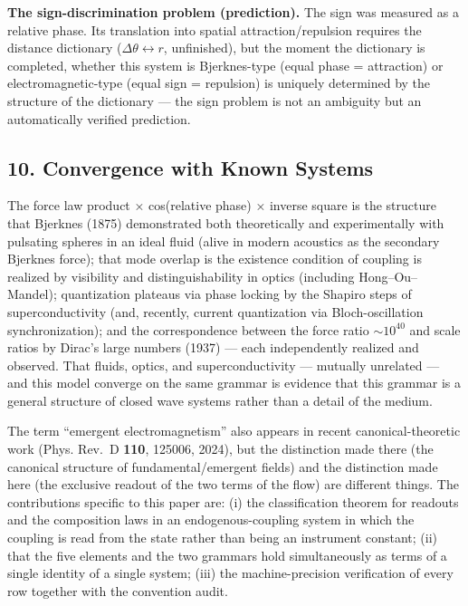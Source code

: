 \documentclass[
  a4paper,
]{article}
\begin{document}
\textbf{The sign-discrimination problem (prediction).} The sign was
measured as a relative phase. Its translation into spatial
attraction/repulsion requires the distance dictionary
(\(\Delta\theta\leftrightarrow r\), unfinished), but the moment the
dictionary is completed, whether this system is Bjerknes-type (equal
phase = attraction) or electromagnetic-type (equal sign = repulsion) is
uniquely determined by the structure of the dictionary --- the sign
problem is not an ambiguity but an automatically verified prediction.

\subsection{10. Convergence with Known
Systems}\label{convergence-with-known-systems}

The force law product × cos(relative phase) × inverse square is the
structure that Bjerknes (1875) demonstrated both theoretically and
experimentally with pulsating spheres in an ideal fluid (alive in modern
acoustics as the secondary Bjerknes force); that mode overlap is the
existence condition of coupling is realized by visibility and
distinguishability in optics (including Hong--Ou--Mandel); quantization
plateaus via phase locking by the Shapiro steps of superconductivity
(and, recently, current quantization via Bloch-oscillation
synchronization); and the correspondence between the force ratio
\(\sim10^{40}\) and scale ratios by Dirac's large numbers (1937) ---
each independently realized and observed. That fluids, optics, and
superconductivity --- mutually unrelated --- and this model converge on
the same grammar is evidence that this grammar is a general structure of
closed wave systems rather than a detail of the medium.

The term ``emergent electromagnetism'' also appears in recent
canonical-theoretic work (Phys. Rev.~D \textbf{110}, 125006, 2024), but
the distinction made there (the canonical structure of
fundamental/emergent fields) and the distinction made here (the
exclusive readout of the two terms of the flow) are different things.
The contributions specific to this paper are: (i) the classification
theorem for readouts and the composition laws in an endogenous-coupling
system in which the coupling is read from the state rather than being an
instrument constant; (ii) that the five elements and the two grammars
hold simultaneously as terms of a single identity of a single system;
(iii) the machine-precision verification of every row together with the
convention audit.
\end{document}
